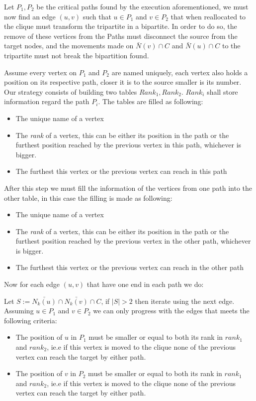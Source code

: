 Let $P_1,P_2$ be the critical paths found by the execution aforementioned, we must now find an edge $(u,v)$ such that $u \in P_1$ and $v \in P_2$ that when reallocated to the clique must transform the tripartite in a bipartite.
In order to do so, the remove of these vertices from the Paths must disconnect the source from the target nodes, and the movements made on $\bar{N}(v) \cap C$ and $\bar{N}(u) \cap C$ to the tripartite must not break the bipartition found.

Assume every vertex on $P_1$ and $P_2$ are named uniquely, each vertex also holds a position on its respective path, closer it is to the source smaller is its number.
Our strategy consists of building two tables $Rank_1,Rank_2$. $Rank_i$ shall store information regard the path $P_i$.
The tables are filled as following:
\begin{itemize}
  \item The unique name of a vertex
  \item The \emph{rank} of a vertex, this can be either its position in the path or the furthest position reached by the previous vertex in this path, whichever is bigger.
  \item The furthest this vertex or the previous vertex can reach in this path
\end{itemize}

After this step we must fill the information of the vertices from one path into the other table, in this case the filling is made as following:
\begin{itemize}
  \item The unique name of a vertex
  \item The \emph{rank} of a vertex, this can be either its position in the path or the furthest position reached by the previous vertex in the other path, whichever is bigger.
  \item The furthest this vertex or the previous vertex can reach in the other path
\end{itemize}

Now for each edge $(u,v)$ that have one end in each path we do:

Let $S:= \bar{N_k(u)} \cap \bar{N_k(v)} \cap C$, if $|S|>2$ then iterate using the next edge. Assuming $u \in P_1$ and $v \in P_2$ we can only progress with the edges that meets the following criteria:

\begin{itemize}
  \item The position of $u$ in $P_1$ must be smaller or equal to both its rank in $rank_1$ and $rank_2$, ie.e if this vertex is moved to the clique none of the previous vertex can reach the target by either path.
  \item The position of $v$ in $P_2$ must be smaller or equal to both its rank in $rank_1$ and $rank_2$, ie.e if this vertex is moved to the clique none of the previous vertex can reach the target by either path.
\end{itemize}


